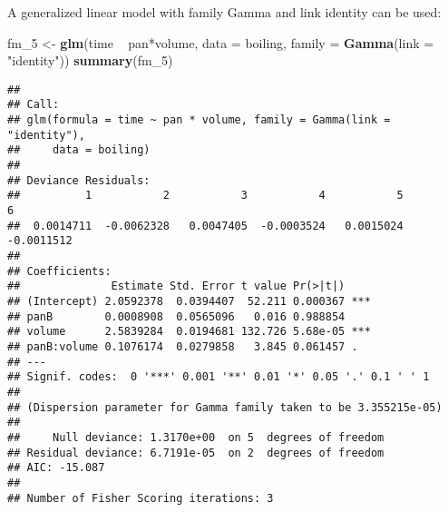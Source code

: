 \documentclass[]{book}
\newenvironment{Shaded}{\begin{snugshade}}{\end{snugshade}}
\newcommand{\KeywordTok}[1]{\textcolor[rgb]{0.13,0.29,0.53}{\textbf{{#1}}}}
\newcommand{\DataTypeTok}[1]{\textcolor[rgb]{0.13,0.29,0.53}{{#1}}}
\newcommand{\StringTok}[1]{\textcolor[rgb]{0.31,0.60,0.02}{{#1}}}
\newcommand{\NormalTok}[1]{{#1}}
\begin{document}
A generalized linear model with family Gamma and link identity can be
used:

\begin{Shaded}
\begin{Highlighting}[]
\NormalTok{fm_5 <-}\StringTok{ }\KeywordTok{glm}\NormalTok{(time ~}\StringTok{ }\NormalTok{pan*volume, }\DataTypeTok{data =} \NormalTok{boiling,}
  \DataTypeTok{family =} \KeywordTok{Gamma}\NormalTok{(}\DataTypeTok{link =} \StringTok{"identity"}\NormalTok{))}
\KeywordTok{summary}\NormalTok{(fm_5) }
\end{Highlighting}
\end{Shaded}

\begin{verbatim}
## 
## Call:
## glm(formula = time ~ pan * volume, family = Gamma(link = "identity"), 
##     data = boiling)
## 
## Deviance Residuals: 
##          1           2           3           4           5           6  
##  0.0014711  -0.0062328   0.0047405  -0.0003524   0.0015024  -0.0011512  
## 
## Coefficients:
##              Estimate Std. Error t value Pr(>|t|)    
## (Intercept) 2.0592378  0.0394407  52.211 0.000367 ***
## panB        0.0008908  0.0565096   0.016 0.988854    
## volume      2.5839284  0.0194681 132.726 5.68e-05 ***
## panB:volume 0.1076174  0.0279858   3.845 0.061457 .  
## ---
## Signif. codes:  0 '***' 0.001 '**' 0.01 '*' 0.05 '.' 0.1 ' ' 1
## 
## (Dispersion parameter for Gamma family taken to be 3.355215e-05)
## 
##     Null deviance: 1.3170e+00  on 5  degrees of freedom
## Residual deviance: 6.7191e-05  on 2  degrees of freedom
## AIC: -15.087
## 
## Number of Fisher Scoring iterations: 3
\end{verbatim}
\end{document}
